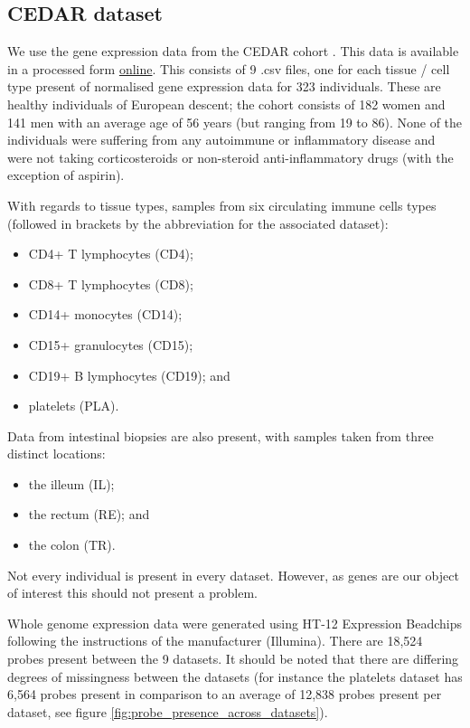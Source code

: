 \documentclass[12pt]{article} %
\begin{document}
	
	\subsection{CEDAR dataset}
	We use the gene expression data from the CEDAR cohort \cite{TheInternationalIBDGeneticsConsortiumIBDriskloci2018}. This data is available in a processed form \href{http://139.165.108.18/srv/genmol/permanent/1be6993fe41c12a051c9244d67c91da2be49e5dd26a6cd79f442bc006971e2ef/crohn-index.html}{online}. This consists of 9 .csv files, one for each tissue / cell type present of normalised gene expression data for 323 individuals. These are healthy individuals of European descent; the cohort consists of 182 women and 141 men with an average age of 56 years (but ranging from 19 to 86). None of the individuals were suffering from any autoimmune or inflammatory disease and were not taking corticosteroids or non-steroid anti-inflammatory drugs (with the exception of aspirin). 
	
	With regards to tissue types, samples from six circulating immune cells types (followed in brackets by the abbreviation for the associated dataset):
	\begin{itemize}
		\item CD4+ T lymphocytes (CD4);
		\item CD8+ T lymphocytes (CD8);
		\item CD14+ monocytes (CD14);
		\item CD15+ granulocytes (CD15);
		\item CD19+ B lymphocytes (CD19); and 
		\item platelets (PLA).
	\end{itemize}
	Data from intestinal biopsies are also present, with samples taken from three distinct locations:
	\begin{itemize}
		\item the illeum (IL);
		\item the rectum (RE); and
		\item the colon (TR).
	\end{itemize} 
	Not every individual is present in every dataset. However, as genes are our object of interest this should not present a problem.
	
	Whole genome expression data were generated using HT-12 Expression Beadchips following the instructions of the manufacturer (Illumina). There are 18,524 probes present between the 9 datasets. It should be noted that there are differing degrees of missingness between the datasets (for instance the platelets dataset has 6,564 probes present in comparison to an average of 12,838 probes present per dataset, see figure \ref{fig:probe_presence_across_datasets}).
	
\end{document}
